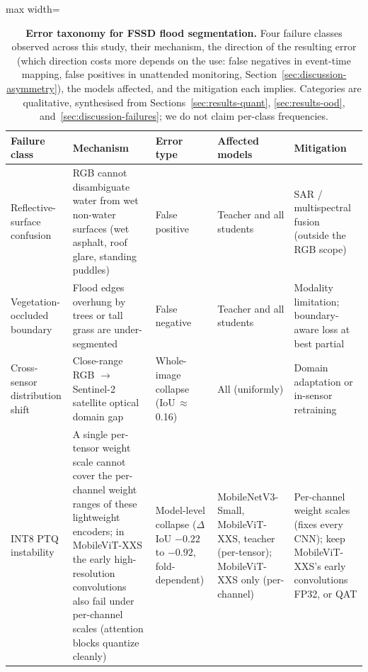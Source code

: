 \begin{table}[ht]
\centering
\caption{\textbf{Error taxonomy for FSSD flood segmentation.} Four failure classes observed across this study, their mechanism, the direction of the resulting error (which direction costs more depends on the use: false negatives in event-time mapping, false positives in unattended monitoring, Section~\ref{sec:discussion-asymmetry}), the models affected, and the mitigation each implies. Categories are qualitative, synthesised from Sections~\ref{sec:results-quant}, \ref{sec:results-ood}, and~\ref{sec:discussion-failures}; we do not claim per-class frequencies.}
\label{tab:t8-taxonomy}
\small
\setlength{\tabcolsep}{4pt}
\begin{adjustbox}{max width=\textwidth}
\begin{tabular}{p{2.6cm}p{4.2cm}p{2.1cm}p{2.4cm}p{3.2cm}}
\toprule
\textbf{Failure class} & \textbf{Mechanism} & \textbf{Error type} & \textbf{Affected models} & \textbf{Mitigation} \\
\midrule
Reflective-surface confusion
  & RGB cannot disambiguate water from wet non-water surfaces (wet asphalt, roof glare, standing puddles)
  & False positive
  & Teacher and all students
  & SAR / multispectral fusion (outside the RGB scope) \\
\addlinespace
Vegetation-occluded boundary
  & Flood edges overhung by trees or tall grass are under-segmented
  & False negative
  & Teacher and all students
  & Modality limitation; boundary-aware loss at best partial \\
\addlinespace
Cross-sensor distribution shift
  & Close-range RGB $\rightarrow$ Sentinel-2 satellite optical domain gap
  & Whole-image collapse (IoU\,$\approx$\,0.16)
  & All (uniformly)
  & Domain adaptation or in-sensor retraining \\
\addlinespace
INT8 PTQ instability
  & A single per-tensor weight scale cannot cover the per-channel weight ranges of these lightweight encoders; in MobileViT-XXS the early high-resolution convolutions also fail under per-channel scales (attention blocks quantize cleanly)
  & Model-level collapse ($\Delta$IoU $-0.22$ to $-0.92$, fold-dependent)
  & MobileNetV3-Small, MobileViT-XXS, teacher (per-tensor); MobileViT-XXS only (per-channel)
  & Per-channel weight scales (fixes every CNN); keep MobileViT-XXS's early convolutions FP32, or QAT \\
\bottomrule
\end{tabular}
\end{adjustbox}
\end{table}
